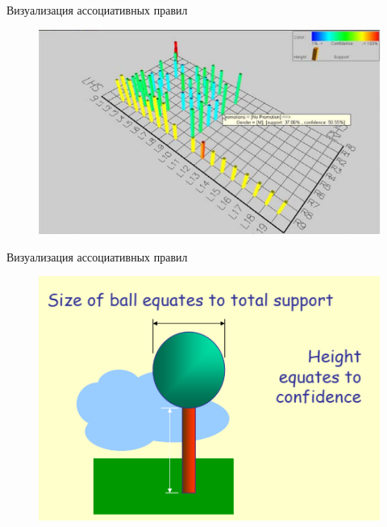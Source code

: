 \documentclass{beamer}
\begin{document}
\begin{frame}{Визуализация ассоциативных правил}
	\begin{figure}[h]
		\centering
		\includegraphics[scale=0.7]{images/lec08-pic28.png}
	\end{figure}
\end{frame}

\begin{frame}{Визуализация ассоциативных правил}
	\begin{figure}[h]
		\centering
		\includegraphics[scale=0.75]{images/lec08-pic29.png}
	\end{figure}
\end{frame}
\end{document}
